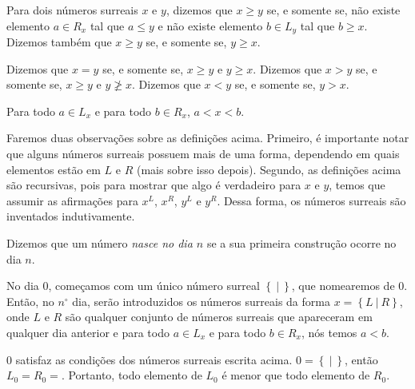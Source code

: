 \documentclass[10pt, a4paper]{article}
\newcommand\s[2]{\left\{#1\ |\ #2\right\}}
\newcommand\sse{se, e somente se, }
\begin{document}
	\begin{defn}
		Para dois números surreais $x$ e $y$, dizemos que $x \ge y$ \sse não existe elemento $a \in R_x$ tal que $a \le y$ e não existe elemento $b \in L_y$ tal que $b \ge x$. Dizemos também que $x \ge y$ \sse $y \ge x$.
	\end{defn}

	\begin{defn}
		Dizemos que $x = y$ \sse $x \ge y$ e $y \ge x$. Dizemos que $x > y$ \sse $x \ge y$ e $y \not\ge x$. Dizemos que $x < y$ \sse $y > x$.
	\end{defn}

	\begin{defn}
		Para todo $a \in L_x$ e para todo $b \in R_x$, $a < x < b$.
	\end{defn}

	Faremos duas observações sobre as definições acima. Primeiro, é importante notar que alguns números surreais possuem mais de uma forma, dependendo em quais elementos estão em $L$ e $R$ (mais sobre isso depois). Segundo, as definições acima são recursivas, pois para mostrar que algo é verdadeiro para $x$ e $y$, temos que assumir as afirmações para $x^L$, $x^R$, $y^L$ e $y^R$. Dessa forma, os números surreais são inventados indutivamente.

	\begin{defn}
		Dizemos que um número \emph{nasce no dia $n$} se a sua primeira construção ocorre no dia $n$.
	\end{defn}

	No dia $0$, começamos com um único número surreal $\s{}{}$, que nomearemos de $0$. Então, no $n^\circ$ dia, serão introduzidos os números surreais da forma $x = \s{L}{R}$, onde $L$ e $R$ são qualquer conjunto de números surreais que apareceram em qualquer dia anterior e para todo $a \in L_x$ e para todo $b \in R_x$, nós temos $a < b$.

	$0$ satisfaz as condições dos números surreais escrita acima. $0 = \s{}{}$, então $L_0 = R_0 = {}$. Portanto, todo elemento de $L_0$ é menor que todo elemento de $R_0$.
\end{document}
